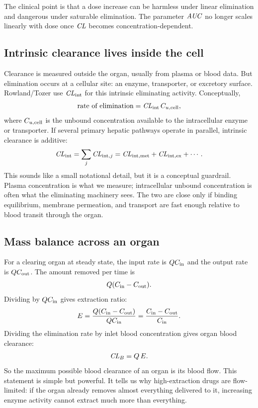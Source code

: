 \documentclass[a4paper]{article}
\newcommand{\CL}{\ensuremath{\pksym{CL}}}
\newcommand{\CLB}{\ensuremath{\pksym{CL}_{B}}}
\newcommand{\CLint}{\ensuremath{\pksym{CL}_{\pklab{int}}}}
\newcommand{\AUC}{\ensuremath{\pksym{AUC}}}
\newcommand{\Cin}{\ensuremath{C_{\pklab{in}}}}
\newcommand{\Cout}{\ensuremath{C_{\pklab{out}}}}
\begin{document}
The clinical point is that a dose increase can be harmless under linear elimination and dangerous under saturable elimination. The parameter \(\AUC\) no longer scales linearly with dose once \(\CL\) becomes concentration-dependent.

\subsection{Intrinsic clearance lives inside the cell}

Clearance is measured outside the organ, usually from plasma or blood data. But elimination occurs at a cellular site: an enzyme, transporter, or excretory surface. Rowland/Tozer use \(\CLint\) for this intrinsic eliminating activity. Conceptually,
\[
  \text{rate of elimination}
  =
  \CLint\,C_{u,\pklab{cell}},
\]
where \(C_{u,\mathrm{cell}}\) is the unbound concentration available to the intracellular enzyme or transporter. If several primary hepatic pathways operate in parallel, intrinsic clearance is additive:
\[
  \CLint
  =
  \sum_j \CL_{\pklab{int},j}
  =
  \CL_{\pklab{int,met}}
  +
  \CL_{\pklab{int,ex}}
  +
  \cdots.
\]
This sounds like a small notational detail, but it is a conceptual guardrail. Plasma concentration is what we measure; intracellular unbound concentration is often what the eliminating machinery sees. The two are close only if binding equilibrium, membrane permeation, and transport are fast enough relative to blood transit through the organ.

\subsection{Mass balance across an organ}

For a clearing organ at steady state, the input rate is \(Q\Cin\) and the output rate is \(Q\Cout\). The amount removed per time is
\[
  Q(\Cin-\Cout).
\]
Dividing by \(Q\Cin\) gives extraction ratio:
\[
  E=\frac{Q(\Cin-\Cout)}{Q\Cin}
   =\frac{\Cin-\Cout}{\Cin}.
\]
Dividing the elimination rate by inlet blood concentration gives organ blood clearance:
\[
  \CLB = Q\,E.
\]
So the maximum possible blood clearance of an organ is its blood flow. This statement is simple but powerful. It tells us why high-extraction drugs are flow-limited: if the organ already removes almost everything delivered to it, increasing enzyme activity cannot extract much more than everything.
\end{document}
